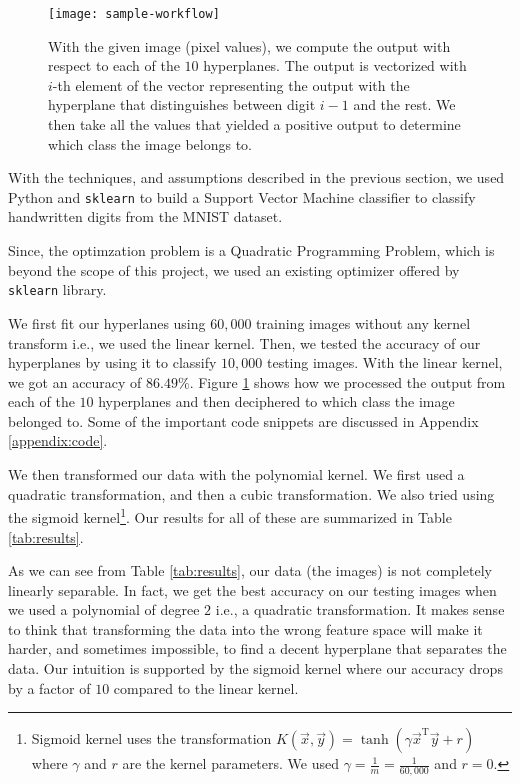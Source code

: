 
\begin{figure}[!tb]
	\texttt{[image: sample-workflow]}
	\centering
	\caption{With the given image (pixel values), we compute the output with respect to each of the $10$ hyperplanes. The output is vectorized with $i$-th element of the vector representing the output with the hyperplane that distinguishes between digit $i-1$ and the rest. We then take all the values that yielded a positive output to determine which class the image belongs to.}
	\label{fig:workflow}
\end{figure}

With the techniques, and assumptions described in the previous section, we used Python and \texttt{sklearn} to build a Support Vector Machine classifier to classify handwritten digits from the MNIST dataset.

Since, the optimzation problem is a Quadratic Programming Problem, which is beyond the scope of this project, we used an existing optimizer offered by \texttt{sklearn} library.

We first fit our hyperlanes using $60,000$ training images without any kernel transform i.e., we used the linear kernel. Then, we tested the accuracy of our hyperplanes by using it to classify $10,000$ testing images. With the linear kernel, we got an accuracy of $86.49 \%$. Figure \ref{fig:workflow} shows how we processed the output from each of the $10$ hyperplanes and then deciphered to which class the image belonged to. Some of the important code snippets are discussed in Appendix \ref{appendix:code}.

We then transformed our data with the polynomial kernel. We first used a quadratic transformation, and then a cubic transformation. We also tried using the sigmoid kernel\footnote{Sigmoid kernel uses the transformation $K(\vec{x}, \vec{y}) = \tanh(\gamma\vec{x}^{\text{T}}\vec{y} + r)$ where $\gamma$ and $r$ are the kernel parameters. We used $\gamma=\frac{1}{m}=\frac{1}{60,000}$ and $r=0$.}. Our results for all of these are summarized in Table \ref{tab:results}.

As we can see from Table \ref{tab:results}, our data (the images) is not completely linearly separable. In fact, we get the best accuracy on our testing images when we used a polynomial of degree $2$ i.e., a quadratic transformation. It makes sense to think that transforming the data into the wrong feature space will make it harder, and sometimes impossible, to find a decent hyperplane that separates the data. Our intuition is supported by the sigmoid kernel where our accuracy drops by a factor of $10$ compared to the linear kernel.

